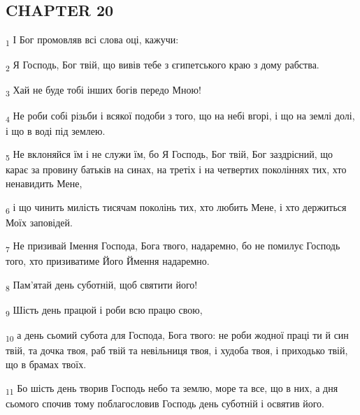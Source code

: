 \subsection{CHAPTER 20}
\begin{tcolorbox}
\textsubscript{1} І Бог промовляв всі слова оці, кажучи:
\end{tcolorbox}
\begin{tcolorbox}
\textsubscript{2} Я Господь, Бог твій, що вивів тебе з єгипетського краю з дому рабства.
\end{tcolorbox}
\begin{tcolorbox}
\textsubscript{3} Хай не буде тобі інших богів передо Мною!
\end{tcolorbox}
\begin{tcolorbox}
\textsubscript{4} Не роби собі різьби і всякої подоби з того, що на небі вгорі, і що на землі долі, і що в воді під землею.
\end{tcolorbox}
\begin{tcolorbox}
\textsubscript{5} Не вклоняйся їм і не служи їм, бо Я Господь, Бог твій, Бог заздрісний, що карає за провину батьків на синах, на третіх і на четвертих поколіннях тих, хто ненавидить Мене,
\end{tcolorbox}
\begin{tcolorbox}
\textsubscript{6} і що чинить милість тисячам поколінь тих, хто любить Мене, і хто держиться Моїх заповідей.
\end{tcolorbox}
\begin{tcolorbox}
\textsubscript{7} Не призивай Імення Господа, Бога твого, надаремно, бо не помилує Господь того, хто призиватиме Його Ймення надаремно.
\end{tcolorbox}
\begin{tcolorbox}
\textsubscript{8} Пам'ятай день суботній, щоб святити його!
\end{tcolorbox}
\begin{tcolorbox}
\textsubscript{9} Шість день працюй і роби всю працю свою,
\end{tcolorbox}
\begin{tcolorbox}
\textsubscript{10} а день сьомий субота для Господа, Бога твого: не роби жодної праці ти й син твій, та дочка твоя, раб твій та невільниця твоя, і худоба твоя, і приходько твій, що в брамах твоїх.
\end{tcolorbox}
\begin{tcolorbox}
\textsubscript{11} Бо шість день творив Господь небо та землю, море та все, що в них, а дня сьомого спочив тому поблагословив Господь день суботній і освятив його.
\end{tcolorbox}
